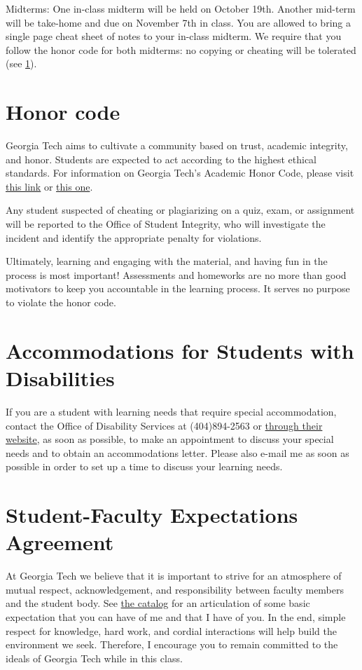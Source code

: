 \documentclass[12pt]{article}
\begin{document}
Midterms: One in-class midterm will be held on October 19th. Another mid-term will be take-home and due on November 7th in class. You are allowed to bring a single page cheat sheet of notes to your in-class midterm. We require that you follow the honor code for both midterms: no copying or cheating will be tolerated (see \ref{sec:honor}).

\section{Honor code}
\label{sec:honor}

Georgia Tech aims to cultivate a community based on trust, academic integrity, and honor. Students are expected to act according to the highest ethical standards.  For information on Georgia Tech's Academic Honor Code, please visit \href{http://www.catalog.gatech.edu/policies/honor-code/}{this link} or \href{http://www.catalog.gatech.edu/rules/18/}{this one}. 

Any student suspected of cheating or plagiarizing on a quiz, exam, or assignment will be reported to the Office of Student Integrity, who will investigate the incident and identify the appropriate penalty for violations.

Ultimately, learning and engaging with the material, and having fun in the process is most important! Assessments and homeworks are no more than good motivators to keep you accountable in the learning process. It serves no purpose to violate the honor code. 

\section{Accommodations for Students with Disabilities} 

If you are a student with learning needs that require special accommodation, contact the Office of Disability Services at (404)894-2563 or \href{http://disabilityservices.gatech.edu/}{through their website}, as soon as possible, to make an appointment to discuss your special needs and to obtain an accommodations letter.  Please also e-mail me as soon as possible in order to set up a time to discuss your learning needs. 

\section{Student-Faculty Expectations Agreement} 

At Georgia Tech we believe that it is important to strive for an atmosphere of mutual respect, acknowledgement, and responsibility between faculty members and the student body. See \href{http://www.catalog.gatech.edu/rules/22/}{the catalog} for an articulation of some basic expectation that you can have of me and that I have of you. In the end, simple respect for knowledge, hard work, and cordial interactions will help build the environment we seek. Therefore, I encourage you to remain committed to the ideals of Georgia Tech while in this class. 


\end{document}
